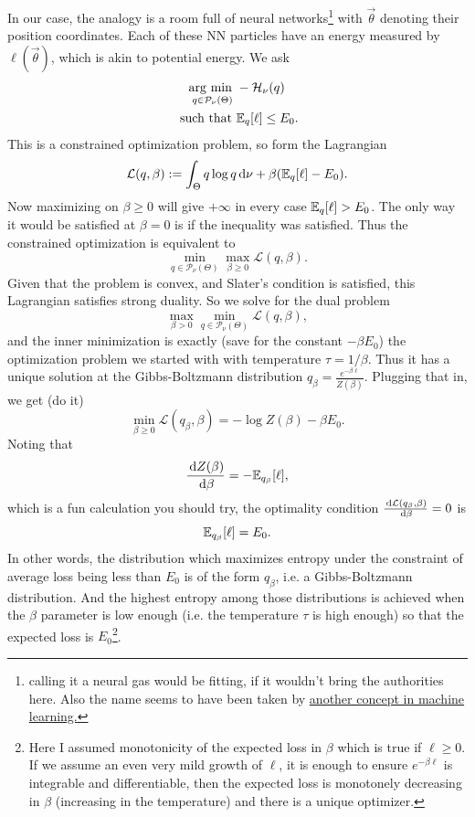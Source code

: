 \documentclass[12pt]{amsart}
\begin{document}
In our case, the analogy is a room full of neural networks\footnote{calling it a neural gas would be fitting, if it wouldn't bring the authorities here. Also the name seems to have been taken by \href{https://en.wikipedia.org/wiki/Neural_gas}{another concept in machine learning.}} with $\vec{\theta}$ denoting their position coordinates. Each of these NN particles have an energy measured by $\ell(\vec{\theta})$, which is akin to potential energy. We ask
\begin{align*}
	\operatorname*{\arg\,\min\,\,}_{q \in \mathcal{P}_\nu(\Theta)} &-\mathcal{H}_{\nu}(q)\\
\text{ such that } & \mathbb{E}_{q} [\ell] \leq E_0.
\end{align*}
This is a constrained optimization problem, so form the Lagrangian 
\[
	\mathcal{L}(q, \beta) := \int_\Theta q\log q \,\mathrm{d}\nu + \beta ( \mathbb{E}_{q}[\ell]  - E_0).
\]
Now maximizing on $\beta \geq 0$ will give $+\infty$ in every case $\mathbb{E}_q[\ell] > E_0$.  The only way it would be satisfied at $\beta = 0$ is if the inequality was satisfied. Thus the constrained optimization is equivalent to
\[
	\min_{q \in \mathcal{P}_\nu(\Theta)} \max_{\beta \geq 0} \mathcal{L}(q, \beta).
\]
Given that the problem is convex, and Slater's condition is satisfied, this Lagrangian satisfies strong duality. So we solve for the dual problem 
\[
	\max_{\beta > 0} \min_{q \in \mathcal{P}_\nu(\Theta)} \mathcal{L}(q, \beta),
\]
and the inner minimization is exactly (save for the constant $-\beta E_0$) the optimization problem we started with with temperature $\tau= 1/\beta$. Thus it has a unique solution at the Gibbs-Boltzmann distribution $q_\beta = \frac{e^{-\beta \ell}}{Z(\beta)}$. Plugging that in, we get (do it)
\[
	\min_{\beta \geq 0} \mathcal{L}(q_\beta, \beta) = - \log Z(\beta) - \beta E_0.
\]
Noting that
\[
	\frac{\,\mathrm{d} Z(\beta)}{\,\mathrm{d} \beta} = - \mathbb{E}_{q_\beta}[\ell],
\]
which is a fun calculation you should try, the optimality condition $\frac{\,\mathrm{d} \mathcal{L}(q_\beta, \beta)}{\,\mathrm{d} \beta} = 0$ is 
\[
	\mathbb{E}_{q_\beta}[\ell] = E_0.
\]
In other words, the distribution which maximizes entropy under the constraint of average loss being less than $E_0$ is of the form $q_\beta$, i.e. a Gibbs-Boltzmann distribution. And the highest entropy among those distributions is achieved when the $\beta$ parameter is  low enough  (i.e. the temperature $\tau$ is high enough) so that the expected loss is $E_0$\footnote{Here I assumed monotonicity of the expected loss in $\beta$ which is true if $\ell \geq 0$. If we assume an even very mild growth of $\ell$, it is enough to ensure $e^{-\beta \ell}$ is integrable and differentiable, then the expected loss is monotonely decreasing in $\beta$ (increasing in the temperature) and there is a unique optimizer.}.
\end{document}
